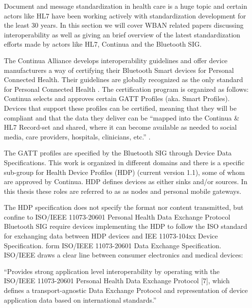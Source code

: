 
Document and message standardization in health care is a huge topic and certain actors like HL7 have been working actively with standardization development for the least 30 years. In this section we will cover WBAN related papers discussing interoperability as well as giving an brief overview of the latest standardization efforts made by actors like HL7, Continua and the Bluetooth SIG.

The Continua Alliance develops interoperability guidelines and offer device manufacturers a way of certifying their Bluetooth Smart devices for Personal Connected Health. Their guidelines are globally recognized as the only standard for Personal Connected Health \cite{newRef:27}. The certification program is organized as follows: Continua selects and approves certain GATT Profiles (aka. Smart Profiles). Devices that support these profiles can be certified, meaning that they will be compliant and that the data they deliver can be ``mapped into the Continua & HL7 Record-set and shared, where it can become available as needed to social media, care providers, hospitals, clinicians, etc.'' \cite{newRef:27}.

The GATT profiles are specified by the Bluetooth SIG through Device Data Specifications. This work is organized in different domains and there is a specific sub-group for Health Device Profiles (HDP) (current version 1.1), some of whom are approved by Continua. HDP defines devices as either sinks and/or sources. In this thesis these roles are referred to as as nodes and personal mobile gateways.

The HDP specification does not specify the format nor content transmitted, but confine to ISO/IEEE 11073-20601 Personal Health Data Exchange Protocol \cite{newRef:18} Bluetooth SIG require devices implementing the HDP to follow the ISO standard for exchanging data between HDP devices and IEE 11073-104xx Device Specification. form ISO/IEEE 11073-20601 Data Exchange Specification. ISO/IEEE draws a clear line between consumer electronics and medical devices: 

``Provides strong application level interoperability by operating with the ISO/IEEE 11073-20601 Personal Health Data Exchange Protocol [7], which defines a transport-agnostic Data Exchange Protocol and representation of device application data based on international standards.''





